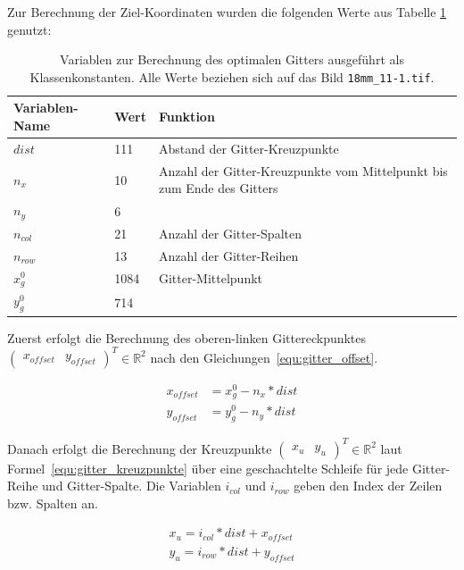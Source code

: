 Zur Berechnung der Ziel-Koordinaten wurden die folgenden Werte aus Tabelle \ref{tab:gitter_koordinaten_variablen} genutzt:

\begin{table}[H]
\centering
\begin{tabular}{|l|l|p{}|}
\hline
Variablen-Name & Wert & Funktion\\
\toprule[2px]
$dist$ & 111 & Abstand der Gitter-Kreuzpunkte\\
\hline
$n_x$ & 10 & Anzahl der Gitter-Kreuzpunkte vom Mittelpunkt bis zum Ende des Gitters\\
$n_y$ & 6 & \\
\hline
$n_{col}$ & 21 & Anzahl der Gitter-Spalten\\
$n_{row}$ & 13 & Anzahl der Gitter-Reihen\\
\hline
$x_g^0$ & 1084 & Gitter-Mittelpunkt \\
$y_g^0$ & 714 & \\
\hline
\end{tabular}
\caption{Variablen zur Berechnung des optimalen Gitters ausgeführt als Klassenkonstanten. Alle Werte beziehen sich auf das Bild \texttt{18mm\_11-1.tif}. }
\label{tab:gitter_koordinaten_variablen}
\end{table}

Zuerst erfolgt die Berechnung des oberen-linken Gittereckpunktes $\begin{pmatrix}
x_{offset} & y_{offset}\end{pmatrix}^T \in \mathbb{R}^2$  nach den Gleichungen~\ref{equ:gitter_offset}. 

\begin{equation}
\label{equ:gitter_offset}
\begin{aligned}
x_{offset} &= x_g^0 - n_x * dist\\
y_{offset} &= y_g^0 - n_y * dist
\end{aligned}
\end{equation}

Danach erfolgt die Berechnung der Kreuzpunkte $\begin{pmatrix}x_{u} & y_{u}\end{pmatrix}^T \in \mathbb{R}^2$ laut Formel~\ref{equ:gitter_kreuzpunkte} über eine geschachtelte Schleife für jede Gitter-Reihe und Gitter-Spalte. Die Variablen $i_{col}$ und $i_{row}$ geben den Index der Zeilen bzw. Spalten an.

\begin{equation}
\label{equ:gitter_kreuzpunkte}
\begin{split}
x_{u} = i_{col} * dist + x_{offset}\\
y_{u} = i_{row} * dist + y_{offset}
\end{split}
\end{equation}

